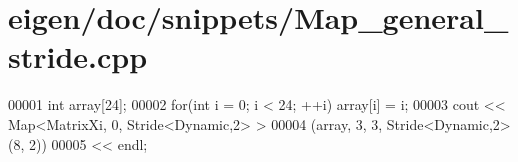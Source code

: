 \hypertarget{eigen_2doc_2snippets_2_map__general__stride_8cpp_source}{}\section{eigen/doc/snippets/\+Map\+\_\+general\+\_\+stride.cpp}
\label{eigen_2doc_2snippets_2_map__general__stride_8cpp_source}

\begin{DoxyCode}
00001 \textcolor{keywordtype}{int} array[24];
00002 \textcolor{keywordflow}{for}(\textcolor{keywordtype}{int} i = 0; i < 24; ++i) array[i] = i;
00003 cout << Map<MatrixXi, 0, Stride<Dynamic,2> >
00004          (array, 3, 3, Stride<Dynamic,2>(8, 2))
00005      << endl;
\end{DoxyCode}
